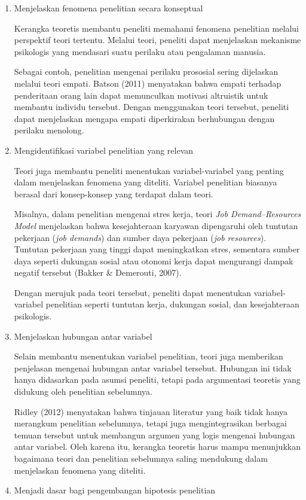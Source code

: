 \documentclass[
  indonesian,
  letterpaper,
  DIV=11,
  numbers=noendperiod]{scrreprt}
\begin{document}
\begin{enumerate}
\def\labelenumi{\arabic{enumi}.}
\item
  Menjelaskan fenomena penelitian secara konseptual

  Kerangka teoretis membantu peneliti memahami fenomena penelitian
  melalui perspektif teori tertentu. Melalui teori, peneliti dapat
  menjelaskan mekanisme psikologis yang mendasari suatu perilaku atau
  pengalaman manusia.

  Sebagai contoh, penelitian mengenai perilaku prososial sering
  dijelaskan melalui teori empati. Batson (2011) menyatakan bahwa empati
  terhadap penderitaan orang lain dapat memunculkan motivasi altruistik
  untuk membantu individu tersebut. Dengan menggunakan teori tersebut,
  peneliti dapat menjelaskan mengapa empati diperkirakan berhubungan
  dengan perilaku menolong.
\item
  Mengidentifikasi variabel penelitian yang relevan

  Teori juga membantu peneliti menentukan variabel-variabel yang penting
  dalam menjelaskan fenomena yang diteliti. Variabel penelitian biasanya
  berasal dari konsep-konsep yang terdapat dalam teori.

  Misalnya, dalam penelitian mengenai stres kerja, teori \emph{Job
  Demand--Resources Model} menjelaskan bahwa kesejahteraan karyawan
  dipengaruhi oleh tuntutan pekerjaan (\emph{job demands}) dan sumber
  daya pekerjaan (\emph{job resources}). Tuntutan pekerjaan yang tinggi
  dapat meningkatkan stres, sementara sumber daya seperti dukungan
  sosial atau otonomi kerja dapat mengurangi dampak negatif tersebut
  (Bakker \& Demerouti, 2007).

  Dengan merujuk pada teori tersebut, peneliti dapat menentukan
  variabel-variabel penelitian seperti tuntutan kerja, dukungan sosial,
  dan kesejahteraan psikologis.
\item
  Menjelaskan hubungan antar variabel

  Selain membantu menentukan variabel penelitian, teori juga memberikan
  penjelasan mengenai hubungan antar variabel tersebut. Hubungan ini
  tidak hanya didasarkan pada asumsi peneliti, tetapi pada argumentasi
  teoretis yang didukung oleh penelitian sebelumnya.

  Ridley (2012) menyatakan bahwa tinjauan literatur yang baik tidak
  hanya merangkum penelitian sebelumnya, tetapi juga mengintegrasikan
  berbagai temuan tersebut untuk membangun argumen yang logis mengenai
  hubungan antar variabel. Oleh karena itu, kerangka teoretis harus
  mampu menunjukkan bagaimana teori dan penelitian sebelumnya saling
  mendukung dalam menjelaskan fenomena yang diteliti.
\item
  Menjadi dasar bagi pengembangan hipotesis penelitian


\end{enumerate}
\end{document}
